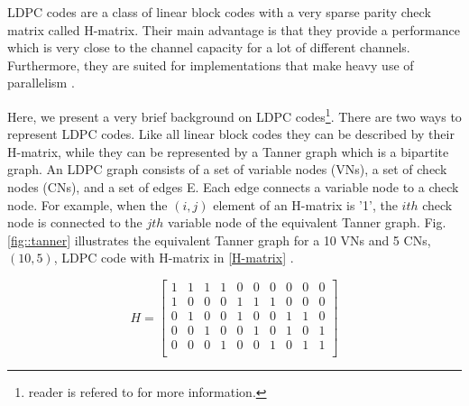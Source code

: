 \documentclass[conference]{IEEEtran}
\begin{document}
LDPC codes are a class of linear block codes with a very sparse parity check matrix called H-matrix. Their main advantage is that they provide a performance which is very close to the channel capacity for a lot of different channels. Furthermore, they are suited for implementations that make heavy use of parallelism \cite{art_castello}.

Here, we present a very brief background on LDPC codes\footnote{reader is refered to \cite{art_castello} for more information.}. There are two ways to represent LDPC codes. Like all linear block codes they can be described by their H-matrix, while they can be represented by a Tanner graph which is a bipartite graph. An LDPC graph consists of a set of variable nodes (VNs), a set of check nodes (CNs), and a set of edges E. Each edge connects a variable node to a check node. For example, when the $(i,j)$ element of an H-matrix is '1', the $ith$ check node is connected to the $jth$ variable node of the equivalent Tanner graph. Fig.\ref{fig::tanner} illustrates the equivalent Tanner graph for a 10 VNs and 5 CNs, $(10,5)$, LDPC code with H-matrix in \eqref{H-matrix} \cite{art_castello}.

\begin{equation}\label{H-matrix}
H=
  \begin{bmatrix}
    1 & 1 & 1 & 1 & 0 &0 &0 &0 &0 &0 \\
    1 & 0 & 0 & 0 & 1 &1 &1 &0 &0 &0 \\
    0 & 1 & 0 & 0 & 1 &0 &0 &1 &1 &0 \\
    0 & 0 & 1 & 0 & 0 &1 &0 &1 &0 &1 \\
    0 & 0 & 0 & 1 & 0 &0 &1 &0 &1 &1 \\
  \end{bmatrix}
\end{equation}
\end{document}
